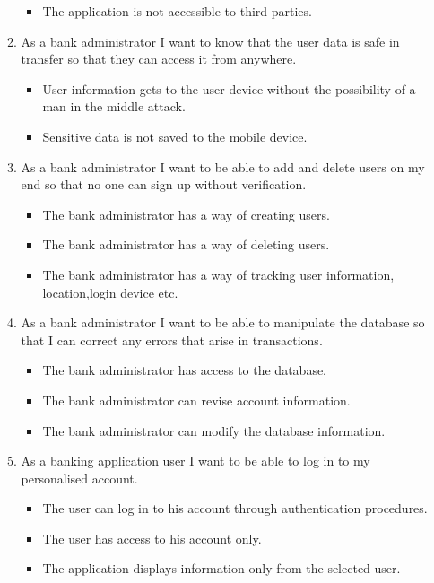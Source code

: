 \begin{itemize}
\begin{enumerate}
\begin{itemize}
                \item The application is not accessible to third parties.
            \end{itemize}
        \item As a bank administrator I want to know that the user data is safe in transfer so that they can access it from anywhere.
            \begin{itemize}
                \item User information gets to the user device without the possibility of a man in the middle attack.
                \item Sensitive data is not saved to the mobile device.
            \end{itemize}
        \item As a bank administrator I want to be able to add and delete users on my end so that no one can sign up without verification.
        \begin{itemize}
                \item The bank administrator has a way of creating users.
                \item The bank administrator has a way of deleting users.
                \item The bank administrator has a way of tracking user information, location,login device etc.
            \end{itemize}
        \item As a bank administrator I want to be able to manipulate the database so that I can correct any errors that arise in transactions.
        \begin{itemize}
                \item The bank administrator has access to the database.
                \item The bank administrator can revise account information.
                \item The bank administrator can modify the database information.
            \end{itemize}
        \item As a banking application user I want to be able to log in to my personalised account.
        \begin{itemize}
                \item The user can log in to his account through authentication procedures.
                \item The user has access to his account only.
                \item The application displays information only from the selected user.

\end{itemize}
\end{enumerate}
\end{itemize}
